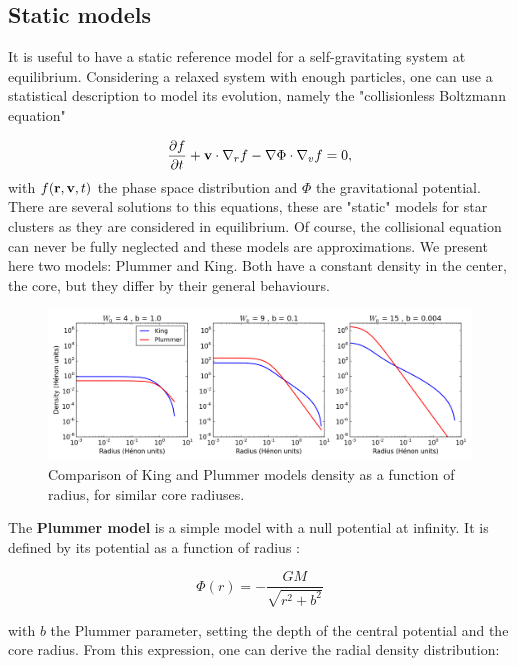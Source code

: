 \subsection{Static models}

It is useful to have a static reference model for a self-gravitating system at equilibrium. Considering a relaxed system with enough particles, one can use a statistical description to model its evolution, namely the "collisionless Boltzmann equation"

\begin{equation}
\frac{\partial f}{\partial t} + \bold{v} \cdot \nabla_r f - \nabla \Phi \cdot \nabla_v f = 0,
\end{equation}
with $f(\bold{r},\bold{v},t)$ the phase space distribution and $\Phi$ the gravitational potential. There are several solutions to this equations, these are "static" models for star clusters as they are considered in equilibrium. Of course, the collisional equation can never be fully neglected and these models are approximations. We present here two models: Plummer and King. Both have a constant density in the center, the core, but they differ by their general behaviours. 


\begin{figure}
\center
\includegraphics[width=0.95\linewidth]{Figures/0_kingplummer.png}
\caption[Radial density for King and Plummer models]{Comparison of King and Plummer models density as a function of radius, for similar core radiuses.}
\label{Fig:0_plummerking}
\end{figure}


The \textbf{Plummer model} is a simple model with a null potential at infinity. It is defined by its potential as a function of radius \citep{BT}:

\begin{equation}
\Phi(r) = - \frac{G M}{\sqrt{r^2 + b^2}}
\end{equation}

with $b$ the Plummer parameter, setting the depth of the central potential and the core radius. From this expression, one can derive the radial density distribution:

